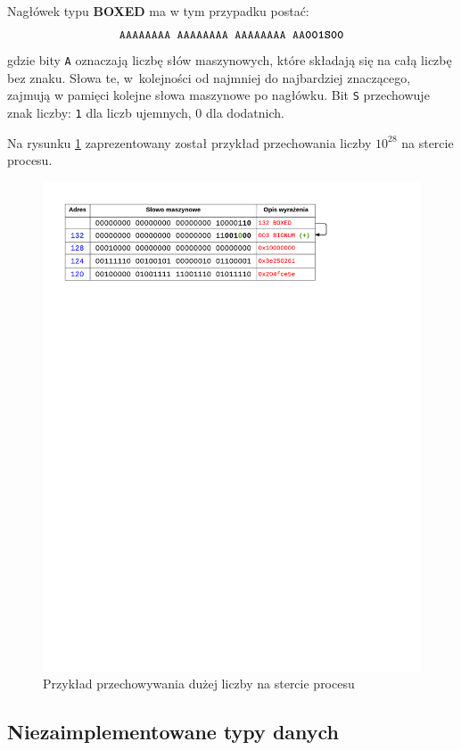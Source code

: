Nagłówek typu \textbf{BOXED} ma w tym przypadku postać:
$$\texttt{AAAAAAAA AAAAAAAA AAAAAAAA AA\textbf{001S00}}$$
gdzie bity \texttt{A} oznaczają liczbę słów maszynowych, które składają się na całą liczbę bez znaku. Słowa te, w~kolejności od najmniej do najbardziej znaczącego, zajmują w pamięci kolejne słowa maszynowe po nagłówku. Bit \texttt{S} przechowuje znak liczby: \texttt{1} dla liczb ujemnych, {0} dla dodatnich.

Na rysunku \ref{fig:bignumonheap} zaprezentowany został przykład przechowania liczby $10^{28}$ na stercie procesu.

\begin{figure}[h]
\centerline{\includegraphics[scale=1, clip, trim=0 223mm 45mm 0]{bignum_on_heap}}
\caption{Przykład przechowywania dużej liczby na stercie procesu}
\label{fig:bignumonheap}
\end{figure}

\subsection{Niezaimplementowane typy danych}
\label{sub:typyNiezaimplementowane}

